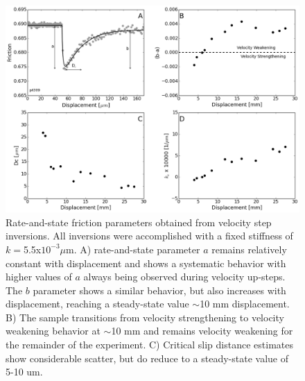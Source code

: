 \documentclass[11pt]{article}
\begin{document}
\begin{figure}
    \centering
        \includegraphics[scale=0.45]{../Figures/Fig_RSF_Parameters/RSF_Parameters.png}
       \caption{Rate-and-state friction parameters obtained from velocity step
       inversions. All inversions were accomplished with a fixed stiffness of
       $k=$5.5x$10 ^ {-3} \mu$m. A) rate-and-state parameter $a$ remains relatively
       constant with displacement and shows a systematic behavior with higher
       values of $a$ always being observed during velocity up-steps. The $b$
       parameter shows a similar behavior, but also increases with displacement,
       reaching a steady-state value $\sim$10 mm displacement. B) The sample
       transitions from velocity strengthening to velocity weakening  behavior
       at $\sim$10 mm and remains velocity weakening for the remainder of  the
       experiment. C) Critical slip distance estimates show considerable
       scatter,  but do reduce to a steady-state value of 5-10 um.}
      \label{Figure:RSF Props}
\end{figure}
\end{document}
